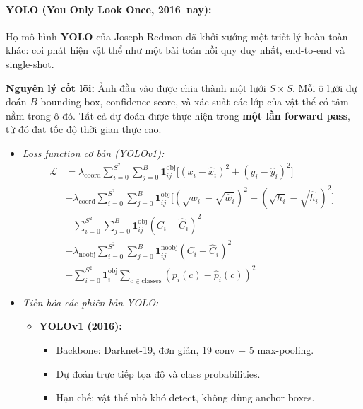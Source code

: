 \paragraph{YOLO (You Only Look Once, 2016–nay):}
Họ mô hình \textbf{YOLO} \cite{Redmon2016} của Joseph Redmon đã khởi xướng một triết lý hoàn toàn khác: coi phát hiện vật thể như một bài toán hồi quy duy nhất, end-to-end và single-shot.

\textbf{Nguyên lý cốt lõi:} Ảnh đầu vào được chia thành một lưới $S \times S$. Mỗi ô lưới dự đoán $B$ bounding box, confidence score, và xác suất các lớp của vật thể có tâm nằm trong ô đó. Tất cả dự đoán được thực hiện trong \textbf{một lần forward pass}, từ đó đạt tốc độ thời gian thực cao.

\begin{itemize}
	\item \textit{Loss function cơ bản (YOLOv1):}
	\begin{equation}
		\begin{split}
			\mathcal{L} &= \lambda_{\text{coord}} \sum_{i=0}^{S^2} \sum_{j=0}^{B} \mathbf{1}_{ij}^{\text{obj}} 
			\Big[ (x_i - \hat{x}_i)^2 + (y_i - \hat{y}_i)^2 \Big] \\
			&+ \lambda_{\text{coord}} \sum_{i=0}^{S^2} \sum_{j=0}^{B} \mathbf{1}_{ij}^{\text{obj}} 
			\Big[ (\sqrt{w_i} - \sqrt{\hat{w}_i})^2 + (\sqrt{h_i} - \sqrt{\hat{h}_i})^2 \Big] \\
			&+ \sum_{i=0}^{S^2} \sum_{j=0}^{B} \mathbf{1}_{ij}^{\text{obj}} (C_i - \hat{C}_i)^2 \\
			&+ \lambda_{\text{noobj}} \sum_{i=0}^{S^2} \sum_{j=0}^{B} \mathbf{1}_{ij}^{\text{noobj}} (C_i - \hat{C}_i)^2 \\
			&+ \sum_{i=0}^{S^2} \mathbf{1}_{i}^{\text{obj}} \sum_{c \in \text{classes}} (p_i(c) - \hat{p}_i(c))^2
		\end{split}
	\end{equation}
	
	\item \textit{Tiến hóa các phiên bản YOLO:}
	\begin{itemize}
		\item \textbf{YOLOv1 (2016):} 
		\begin{itemize}
			\item Backbone: Darknet-19, đơn giản, 19 conv + 5 max-pooling.
			\item Dự đoán trực tiếp tọa độ và class probabilities.
			\item Hạn chế: vật thể nhỏ khó detect, không dùng anchor boxes.
		\end{itemize}
		

\end{itemize}
\end{itemize}
